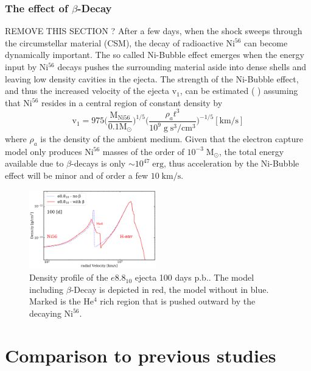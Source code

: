 \documentclass[fleqn,usenatbib]{mnras}
\newcommand{\helium}{$\mathrm{He^{4}}$\xspace}
\newcommand{\nickel}{$\mathrm{Ni^{56}}$\xspace}
\newcommand{\COM}[1]{{\color{red}#1}}
\begin{document}
\subsubsection{The effect of $\beta$-Decay}
\COM{REMOVE THIS SECTION ?}
After a few days, when the shock sweeps through the circumstellar material (CSM), the decay of radioactive \nickel can become dynamically important. The so called Ni-Bubble effect emerges when the energy input by \nickel decays pushes the surrounding material aside into dense shells and leaving low density cavities in the ejecta. The strength of the Ni-Bubble effect, and thus the increased velocity of the ejecta $\mathrm{v}_1$,  can be estimated (\cite{Chevalier2005} ) assuming that \nickel resides in a central region of constant density by
\begin{equation}
\mathrm{v_1} = 975\Big(\frac{\mathrm{M_{Ni56}}}{0.1\mathrm{M_{\odot}}} \Big)^{1/5} \Big( \frac{\rho_a t^3} {10^9 \mathrm{\;g\;s^3/cm^3}}\Big)^{-1/5} \mathrm{[km/s]}
\end{equation}
where $\rho_a$ is the density of the ambient medium. Given that the electron capture model only produces \nickel masses of the order of $10^{-3}\;\mathrm{M_{\odot}}$, the total energy available due to $\beta$-decays is only $\sim 10^{47}\;\mathrm{erg}$, thus acceleration by the Ni-Bubble effect will be minor and of order a few $10\;\mathrm{km/s}$.

\begin{figure}
 \label{fig:e8_beta}
 \centering
 \includegraphics[width=0.49\textwidth]{./pic/e8_10_beta_nobeta_den_vs_vr.pdf}
 \caption{Density profile of the $e8.8_{10}$ ejecta 100 days p.b.. The model including $\beta$-Decay is depicted in red, the model without in blue. Marked is the \helium rich region that is pushed outward by the decaying \nickel. }
\end{figure}

\section{Comparison to previous studies}
\label{sec:Comparison to previous studies}
\end{document}
